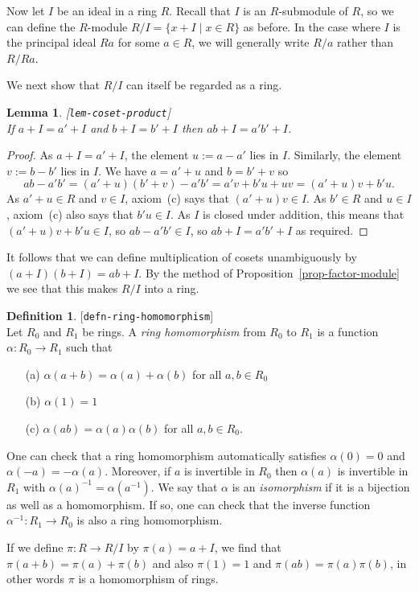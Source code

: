 \documentclass{amsart}
\newcommand{\lbl}[1]{\label{#1}\textup{[\texttt{#1}]}\ \\}
\newcommand{\lbl}{\label}
\newcommand{\al}        {\alpha}
\newcommand{\xra}       {\xrightarrow}
\newcommand{\st}        {\;|\;}
\renewcommand{\:}{\colon}
\newtheorem{lemma}[theorem]{Lemma}
\theoremstyle{definition}
\newtheorem{definition}[theorem]{Definition}
\begin{document}
Now let $I$ be an ideal in a ring $R$.  Recall that $I$ is an
$R$-submodule of $R$, so we can define the $R$-module
$R/I=\{x+I\st x\in R\}$ as before.  In the case where $I$ is the
principal ideal $Ra$ for some $a\in R$, we will generally write $R/a$
rather than $R/Ra$.

We next show that $R/I$ can itself be regarded as a ring.
\begin{lemma}\lbl{lem-coset-product}
 If $a+I=a'+I$ and $b+I=b'+I$ then $ab+I=a'b'+I$.
\end{lemma}
\begin{proof}
 As $a+I=a'+I$, the element $u:=a-a'$ lies in $I$.  Similarly, the
 element $v:=b-b'$ lies in $I$.  We have $a=a'+u$ and $b=b'+v$ so
 \[ ab-a'b'=(a'+u)(b'+v)-a'b'=a'v+b'u+uv=(a'+u)v+b'u. \]
 As $a'+u\in R$ and $v\in I$, axiom~(c) says that $(a'+u)v\in I$.  As
 $b'\in R$ and $u\in I$, axiom~(c) also says that $b'u\in I$.  As $I$
 is closed under addition, this means that $(a'+u)v+b'u\in I$, so
 $ab-a'b'\in I$, so $ab+I=a'b'+I$ as required.
\end{proof}
It follows that we can define multiplication of cosets unambiguously
by $(a+I)(b+I)=ab+I$.  By the method of
Proposition~\ref{prop-factor-module} we see that this makes $R/I$ into
a ring.  
\begin{definition}\lbl{defn-ring-homomorphism}
 Let $R_0$ and $R_1$ be rings.  A \emph{ring homomorphism} from $R_0$
 to $R_1$ is a function $\al\:R_0\xra{}R_1$ such that
 \begin{itemize}
 \item[(a)] $\al(a+b)=\al(a)+\al(b)$ for all $a,b\in R_0$
 \item[(b)] $\al(1)=1$ 
 \item[(c)] $\al(ab)=\al(a)\al(b)$ for all $a,b\in R_0$.
 \end{itemize}
 One can check that a ring homomorphism automatically satisfies
 $\al(0)=0$ and $\al(-a)=-\al(a)$.  Moreover, if $a$ is invertible in
 $R_0$ then $\al(a)$ is invertible in $R_1$ with
 $\al(a)^{-1}=\al(a^{-1})$.  We say that $\al$ is an
 \emph{isomorphism} if it is a bijection as well as a homomorphism.
 If so, one can check that the inverse function
 $\al^{-1}\:R_1\xra{}R_0$ is also a ring homomorphism.  
\end{definition}

If we define $\pi\:R\xra{}R/I$ by $\pi(a)=a+I$, we find that
$\pi(a+b)=\pi(a)+\pi(b)$ and also $\pi(1)=1$ and
$\pi(ab)=\pi(a)\pi(b)$, in other words $\pi$ is a homomorphism of
rings.
\end{document}

